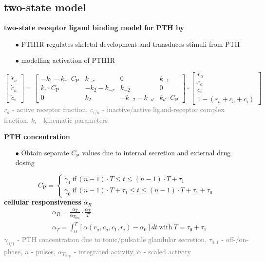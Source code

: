 \documentclass[%
aspectratio=169,  %
]{beamer}
\begin{document}
\subsection{two-state model}
\begin{frame}
\textbf{two-state receptor ligand binding model for PTH by \cite{Martonova.2023}}
\begin{itemize}
	\item[$\bullet$] PTH1R regulates skeletal development and transduces stimuli from PTH
	\item[$\bullet$] modelling activation of PTH1R
\end{itemize}
\begin{equation}
	\begin{bmatrix}
		\dot{r}_a \\ \dot{c}_a \\ \dot{c}_i
	\end{bmatrix} =
	\begin{bmatrix}
		-k_1 -k_r \cdot C_\text{P} & k_{-r} & 0 & k_{-1} \\
		k_r \cdot C_\text{P}  & -k_2-k_{-r} & k_{-2} & 0 \\
		0 & k_2 & -k_{-2} -k_{-d} & k_d \cdot C_\text{P} 
	\end{bmatrix} \cdot
	\begin{bmatrix}
		r_a \\ c_a \\ c_i \\ 1-(r_a+c_a+c_i)
		\end{bmatrix}
	\label{eq:model6}
\end{equation}
\textcolor{gray}{$r_a$ - active receptor fraction, $c_{i/a}$ - inactive/active ligand-receptor complex fraction, $k_i$ - kinematic parameters }
\end{frame}

\begin{frame}
\textbf{PTH concentration}
\begin{itemize}
	\item[$\bullet$]Obtain separate $C_\text{P}$ values due to internal secretion and external drug dosing
\end{itemize}
\begin{equation}
	C_\text{P} = \begin{cases}
		\gamma_1 ~ \text{if} ~ (n-1) \cdot T \leq t \leq (n-1)\cdot T + \tau_1 \\
		\gamma_0 ~ \text{if} ~ (n-1) \cdot T + \tau_1 \leq t \leq (n-1) \cdot T + \tau_1 + \tau_0
	\end{cases}
\end{equation}
\textbf{cellular responsiveness} $\alpha_R$
\begin{align}
	&\alpha_R = \frac{\alpha_T}{\alpha_{T_\text{step}}} \cdot \frac{\alpha_T}{T} \\
	& \alpha_T = \int_0^{T} [\alpha(r_a, c_a, c_1, r_i) -\alpha_0] dt ~\text{with} ~ T = \tau_0+\tau_1
\end{align}
\textcolor{gray}{$\gamma_{0/1}$ - PTH concentration due to tonic/pulsatile glandular secretion, $\tau_{0,1}$ - off-/on-phase, $n$ - pulses, $\alpha_{T_\text{step}}$ - integrated activity, $\alpha$ - scaled activity}
\end{frame}
\end{document}

